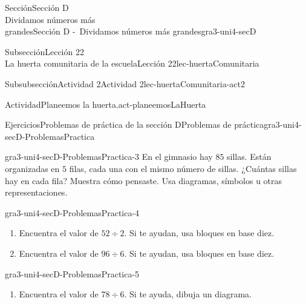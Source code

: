 \begin{sectionptx}{Sección}{{\Large Sección D\\}Dividamos números más\\grandes}{}{Sección D -~Dividamos números más grandes}{}{}{gra3-uni4-secD}
\begin{subsectionptx}{Subsección}{{\normalsize Lección 22\\[-0.05cm]}La huerta comunitaria de la escuela}{}{Lección 22}{}{}{lec-huertaComunitaria}
\begin{subsubsectionptx}{Subsubsección}{Actividad 2}{}{Actividad 2}{}{}{lec-huertaComunitaria-act2}
\begin{activity}{Actividad}{Planeemos la huerta.}{act-planeemosLaHuerta}
\begin{sidebyside}{2}{0.025}{0.025}{0.05}
\end{sidebyside}%
\end{activity}%
%
%
%
%
%
%
\end{subsubsectionptx}
\end{subsectionptx}
%
%
\typeout{************************************************}
\typeout{************************************************}
%
\begin{exercises-subsection}{Ejercicios}{Problemas de práctica de la sección D}{}{Problemas de práctica}{}{}{gra3-uni4-secD-ProblemasPractica}
\begin{divisionexercise}{1}{}{}{gra3-uni4-secD-ProblemasPractica-3}%
En el gimnasio hay \(85\) sillas. Están organizadas en \(5\) filas, cada una con el mismo número de sillas. ¿Cuántas sillas hay en cada fila? Muestra cómo pensaste. Usa diagramas, símbolos u otras representaciones.%
\end{divisionexercise}%
\begin{divisionexercise}{2}{}{}{gra3-uni4-secD-ProblemasPractica-4}%
%
\begin{enumerate}[label={(\alph*)}]
\item{}Encuentra el valor de \(52 \div 2\). Si te ayudan, usa bloques en base diez.%
\item{}Encuentra el valor de \(96 \div 6\). Si te ayudan, usa bloques en base diez.%
\end{enumerate}
\end{divisionexercise}%
\begin{divisionexercise}{3}{}{}{gra3-uni4-secD-ProblemasPractica-5}%
%
\begin{enumerate}[label={(\alph*)}]
\item{}Encuentra el valor de \(78 \div 6\). Si te ayuda, dibuja un diagrama.%

\end{enumerate}
\end{divisionexercise}
\end{exercises-subsection}
\end{sectionptx}
